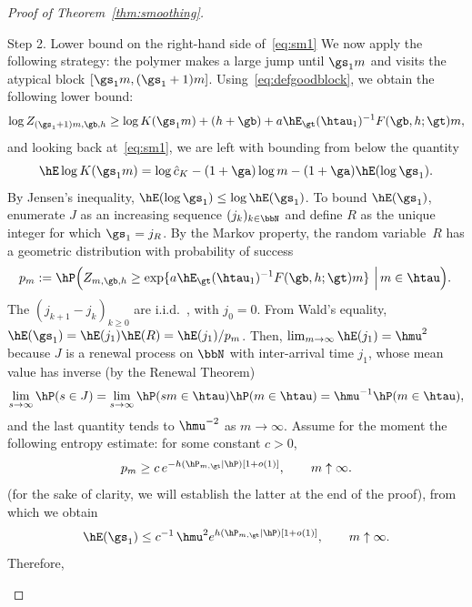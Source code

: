 \begin{proof}[Proof of Theorem~\ref{thm:smoothing}]
\begin{step}{Step 2. Lower bound on the right-hand side of~\eqref{eq:sm1}}
We now apply the following strategy: the polymer makes a large jump until $\gs_1 m$ and visits the atypical block $[\gs_1 m, (\gs_1 + 1) m]$. Using~\eqref{eq:defgoodblock}, we obtain the following lower bound:
\begin{equation}
\log Z_{(\gs_1 + 1) m,\gb,h} \geq \log K(\gs_1 m) + (h + \gb) + a \hE_\gt(\htau_1)^{-1} F(\gb,h;\gt) m,
\end{equation}
and looking back at~\eqref{eq:sm1}, we are left with bounding from below the quantity
\begin{equation}
\hE \log K(\gs_1 m) = \log \hat c_{K} - (1 + \ga) \log m - (1 + \ga) \hE(\log \gs_1).
\end{equation}
By Jensen's inequality, $\hE(\log \gs_1) \leq \log \hE(\gs_1)$. To bound $\hE(\gs_1)$, enumerate $J$ as an increasing sequence $(j_k)_{k\in\bbN}$ and define $R$ as the unique integer for which $\gs_1 = j_R$. By the Markov property, the random variable~$R$ has a geometric distribution with probability of success
\begin{equation}\label{eq.def.pm}
p_m := \hP \Big(Z_{m,\gb,h} \geq \exp\{a \hE_\gt(\htau_1)^{-1} F(\gb,h;\gt) m \} \, \left| \, m \in \htau \Big).\right.
\end{equation}
The $(j_{k+1} - j_k)_{k \geq 0}$ are i.i.d.~, with $j_0 = 0$. From Wald's equality, $\hE(\gs_1) = \hE(j_1) \hE(R) = \hE(j_1)/p_m$. Then, $\lim_{m\to\infty} \hE(j_1) = \hmu^2$ because $J$ is a renewal process on $\bbN$ with inter-arrival time $j_1$, whose mean value has inverse (by the Renewal Theorem)
\begin{equation}
\lim_{s\to\infty} \hP(s \in J) = \lim_{s\to\infty} \hP(s m \in \htau) \hP(m \in \htau) = \hmu^{-1} \hP(m \in \htau),
\end{equation}
and the last quantity tends to $\hmu^{-2}$ as $m \to \infty$. Assume for the moment the following entropy estimate: for some constant $c > 0$,
\begin{equation}\label{eq:entropy.estimate}
p_m \geq c \, e^{- h(\hP_{m,\gt} \mid \hP) [1 + o(1)]}, \qquad m \uparrow \infty.
\end{equation}
(for the sake of clarity, we will establish the latter at the end of the proof), from which we obtain
\begin{equation}
\hE(\gs_1) \leq c^{-1} \, \hmu^2 e^{h(\hP_{m,\gt} \mid \hP) [1 + o(1)]}, \qquad m \uparrow \infty.
\end{equation}
Therefore,

\end{step}
\end{proof}
